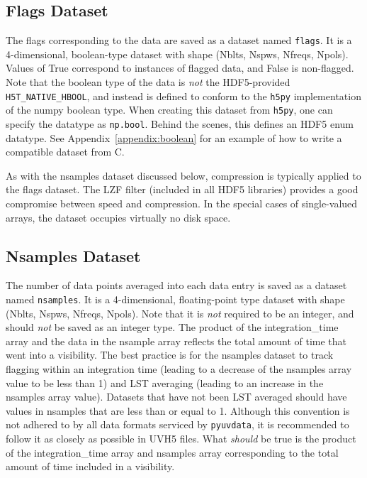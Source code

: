 \documentclass[11pt, oneside]{article}
\begin{document}
\subsection{Flags Dataset}
\label{sec:flags}
The flags corresponding to the data are saved as a dataset named
\verb+flags+. It is a 4-dimensional, boolean-type dataset with shape (Nblts,
Nspws, Nfreqs, Npols). Values of True correspond to instances of flagged data,
and False is non-flagged. Note that the boolean type of the data is \textit{not}
the HDF5-provided \verb+H5T_NATIVE_HBOOL+, and instead is defined to conform to
the \verb+h5py+ implementation of the numpy boolean type. When creating this
dataset from \verb+h5py+, one can specify the datatype as \verb+np.bool+. Behind
the scenes, this defines an HDF5 enum datatype. See
Appendix~\ref{appendix:boolean} for an example of how to write a compatible
dataset from C.

As with the nsamples dataset discussed below, compression is typically applied
to the flags dataset. The LZF filter (included in all HDF5 libraries) provides a
good compromise between speed and compression. In the special cases of
single-valued arrays, the dataset occupies virtually no disk space.

\subsection{Nsamples Dataset}
\label{sec:nsamples}
The number of data points averaged into each data entry is saved as a dataset
named \verb+nsamples+. It is a 4-dimensional, floating-point type dataset with
shape (Nblts, Nspws, Nfreqs, Npols). Note that it is \textit{not} required to be
an integer, and should \textit{not} be saved as an integer type. The product of
the integration\_time array and the data in the nsample array reflects the total
amount of time that went into a visibility. The best practice is for the
nsamples dataset to track flagging within an integration time (leading to a
decrease of the nsamples array value to be less than 1) and LST averaging
(leading to an increase in the nsamples array value). Datasets that have not
been LST averaged should have values in nsamples that are less than or equal to
1. Although this convention is not adhered to by all data formats serviced by
\verb+pyuvdata+, it is recommended to follow it as closely as possible in UVH5
files. What \textit{should} be true is the product of the integration\_time
array and nsamples array corresponding to the total amount of time included in a
visibility.
\end{document}
